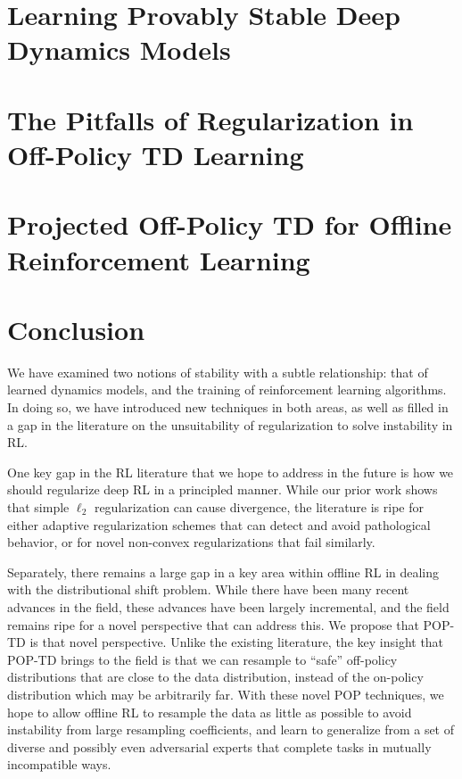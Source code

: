 \documentclass[12pt]{cmuthesis}
\begin{document}
\chapter[Learning Stable Dynamics Models]{Learning Provably Stable Deep Dynamics Models}



\chapter[The Pitfalls of Regularization in Off-Policy TD]{The Pitfalls of Regularization in Off-Policy TD Learning}



\chapter{Projected Off-Policy TD for Offline Reinforcement Learning}



\backmatter{}
\chapter{Conclusion}

We have examined two notions of stability with a subtle relationship: that of learned dynamics models, and the training of reinforcement learning algorithms. In doing so, we have introduced new techniques in both areas, as well as filled in a gap in the literature on the unsuitability of regularization to solve instability in RL.

One key gap in the RL literature that we hope to address in the future is how we should regularize deep RL in a principled manner. While our prior work shows that simple $\ell_2$ regularization can cause divergence, the literature is ripe for either adaptive regularization schemes that can detect and avoid pathological behavior, or for novel non-convex regularizations that fail similarly.

Separately, there remains a large gap in a key area within offline RL in dealing with the distributional shift problem. While there have been many recent advances in the field, these advances have been largely incremental, and the field remains ripe for a novel perspective that can address this. We propose that POP-TD is that novel perspective. Unlike the existing literature, the key insight that POP-TD brings to the field is that we can resample to ``safe'' off-policy distributions that are close to the data distribution, instead of the on-policy distribution which may be arbitrarily far. With these novel POP techniques, we hope to allow offline RL to resample the data as little as possible to avoid instability from large resampling coefficients, and learn to generalize from a set of diverse and possibly even adversarial experts that complete tasks in mutually incompatible ways.

\appendix


\printbibliography{}
\end{document}
